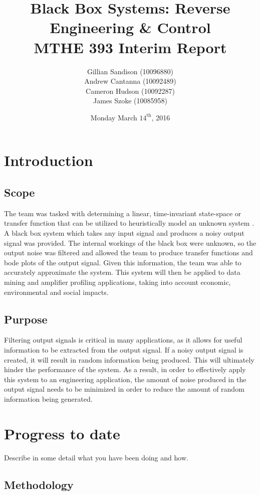 \documentclass[12pt,letterpaper]{article}
\title{Black Box Systems: Reverse Engineering & Control\\MTHE 393 Interim Report}
\date{Monday March $14^{\textrm{th}}$, 2016}
\author{Gillian Sandison (10096880)\\Andrew Cantanna (10092489) \\Cameron Hudson (10092287)\\
James Szoke (10085958)\\}
\begin{document}
\begin{titlepage}
\maketitle
\end{titlepage}
\tableofcontents

\newpage

\section{Introduction}
\subsection{Scope}

The team was tasked with determining a linear, time-invariant state-space or transfer function that can be utilized to heuristically model an unknown system \cite{mathwebsite}.  A black box system which takes any input signal and produces a noisy output signal was provided. The internal workings of the black box were unknown, so the output noise was filtered and allowed the team to produce transfer functions and bode plots of the output signal. Given this information, the team was able to accurately approximate the system. This system will then be applied to data mining and amplifier profiling applications, taking into account economic, environmental and social impacts.
\par
\subsection{Purpose}
Filtering output signals is critical in many applications, as it allows for useful information to be extracted from the output signal.  If a noisy output signal is created, it will result in random information being produced. This will ultimately hinder the performance of the system. As a result, in order to effectively apply this system to an engineering application, the amount of noise produced in the output signal needs to be minimized in order to reduce the amount of random information being generated.


\section{Progress to date}

Describe in some detail what you have been doing and how.

\subsection{Methodology}
\end{document}
